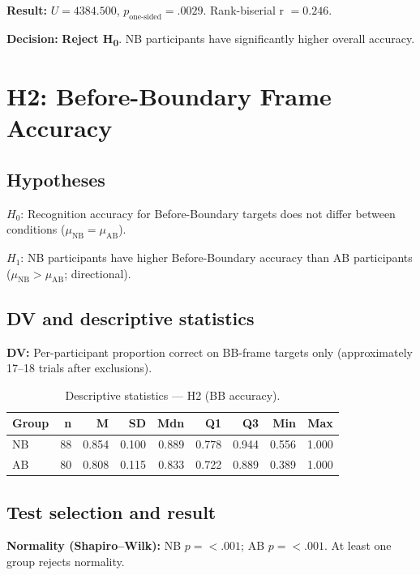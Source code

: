 \documentclass[12pt,a4paper]{article}
\begin{document}
\textbf{Result:} $U = 4384.500$, $p_{\text{one-sided}} = .0029$. Rank-biserial r $= 0.246$.

\textbf{Decision:} \textbf{Reject H\textsubscript{0}}. NB participants have significantly higher overall accuracy.


\section{H2: Before-Boundary Frame Accuracy}

\subsection{Hypotheses}

$H_0$: Recognition accuracy for Before-Boundary targets does not differ between conditions ($\mu_{\text{NB}} = \mu_{\text{AB}}$).

$H_1$: NB participants have higher Before-Boundary accuracy than AB participants ($\mu_{\text{NB}} > \mu_{\text{AB}}$; directional).

\subsection{DV and descriptive statistics}

\textbf{DV:} Per-participant proportion correct on BB-frame targets only (approximately 17--18 trials after exclusions).


\begin{table}[h!]
\centering
\small
\begin{tabular}{lrrrrrrrr}
\hline
\textbf{Group} & \textbf{n} & \textbf{M} & \textbf{SD} & \textbf{Mdn} & \textbf{Q1} & \textbf{Q3} & \textbf{Min} & \textbf{Max} \\
\hline
    NB & 88 & 0.854 & 0.100 & 0.889 & 0.778 & 0.944 & 0.556 & 1.000 \\
    AB & 80 & 0.808 & 0.115 & 0.833 & 0.722 & 0.889 & 0.389 & 1.000 \\
\hline
\end{tabular}
\caption{Descriptive statistics --- H2 (BB accuracy).}
\label{tab:h2_desc}
\end{table}

\subsection{Test selection and result}

\textbf{Normality (Shapiro--Wilk):} NB $p = <.001$; AB $p = <.001$. At least one group rejects normality.
\end{document}

